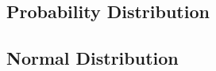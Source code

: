 \documentclass[
	11pt, %
	handout,
]{beamer}
\begin{document}

\subsection{Probability Distribution}


\subsection{Normal Distribution}
















\end{document}
